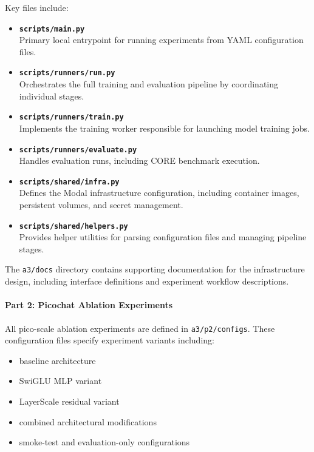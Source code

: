 Key files include:

\begin{itemize}

\item \textbf{\texttt{scripts/main.py}} \\
Primary local entrypoint for running experiments from YAML configuration
files.

\item \textbf{\texttt{scripts/runners/run.py}} \\
Orchestrates the full training and evaluation pipeline by coordinating
individual stages.

\item \textbf{\texttt{scripts/runners/train.py}} \\
Implements the training worker responsible for launching model training
jobs.

\item \textbf{\texttt{scripts/runners/evaluate.py}} \\
Handles evaluation runs, including CORE benchmark execution.

\item \textbf{\texttt{scripts/shared/infra.py}} \\
Defines the Modal infrastructure configuration, including container
images, persistent volumes, and secret management.

\item \textbf{\texttt{scripts/shared/helpers.py}} \\
Provides helper utilities for parsing configuration files and managing
pipeline stages.

\end{itemize}

The \texttt{a3/docs} directory contains supporting documentation for the
infrastructure design, including interface definitions and experiment
workflow descriptions.

\paragraph{Part 2: Picochat Ablation Experiments}

All pico-scale ablation experiments are defined in
\texttt{a3/p2/configs}. These configuration files specify experiment
variants including:

\begin{itemize}
\item baseline architecture
\item SwiGLU MLP variant
\item LayerScale residual variant
\item combined architectural modifications
\item smoke-test and evaluation-only configurations
\end{itemize}

